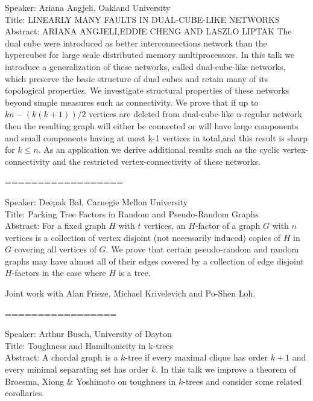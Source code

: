 \documentclass[11pt]{article}
\newenvironment{absquote}
               {{\center\bfseries Abstract\endcenter}%
                 \list{}{\leftmargin2cm\rightmargin\leftmargin}%
                \item\relax\footnotesize}
               {\endlist}
\def\author#1{\center#1\endcenter}
\def\articletitle#1{\center{\bfseries\LARGE{#1}}\endcenter}
\def\serial#1{{\bfseries\hfill#1\hspace{1em}}}
\begin{document}
%
%
%


Speaker: Ariana Angjeli, Oakland University\\
Title:  LINEARLY MANY FAULTS IN DUAL-CUBE-LIKE NETWORKS \\
Abstract: 
   ARIANA ANGJELI,EDDIE CHENG AND LASZLO LIPTAK
The dual cube were introduced as better interconnections network
than the hypercubes for large scale distributed memory multiprocessors. In
this talk we introduce a generalization of these networks, called
dual-cube-like networks, which preserve the basic structure of dual cubes
and retain many of its topological properties. We investigate structural
properties of these networks beyond simple measures such as connectivity. We
prove that if up to $kn-(k(k+1))/2$ vertices are deleted from dual-cube-like
n-regular network then the resulting graph will either be connected or will
have large components and small components having at most k-1 vertices in
total,and this result is sharp for $k\leq n$. As an application we derive
additional results such as the cyclic vertex-connectivity and the restricted
vertex-connectivity of these networks.

==================

Speaker: Deepak Bal, Carnegie Mellon University\\
Title: Packing Tree Factors in Random and Pseudo-Random Graphs\\
Abstract:  For a fixed graph $H$ with $t$ vertices, an $H$-factor of a graph
$G$ with $n$ vertices is a collection of vertex disjoint (not necessarily
induced) copies of $H$ in $G$ covering all vertices of $G$.  We prove that
certain pseudo-random and random graphs may have almost all of their edges
covered by a collection of edge disjoint $H$-factors in the case where $H$
is a tree.

Joint work with Alan Frieze, Michael Krivelevich and Po-Shen Loh. 

=================

Speaker: Arthur Busch, University of Dayton\\
Title:  Toughness and Hamiltonicity in k-trees \\
Abstract:  A chordal graph is a $k$-tree if every maximal clique has order
$k+1$ and every minimal separating set has order $k$.  In this talk we
improve a theorem of Broesma, Xiong \& Yoshimoto on toughness in $k$-trees
and consider some related corollaries. 
\end{document}
